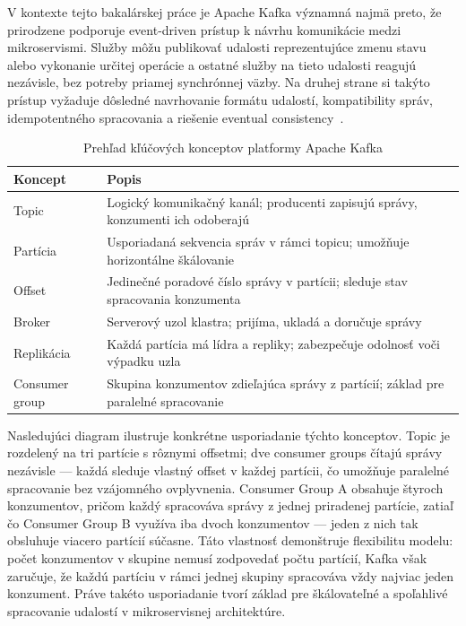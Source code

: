 V kontexte tejto bakalárskej práce je Apache Kafka významná najmä preto, že prirodzene podporuje event-driven prístup k návrhu komunikácie medzi mikroservismi. Služby môžu publikovať udalosti reprezentujúce zmenu stavu alebo vykonanie určitej operácie a ostatné služby na tieto udalosti reagujú nezávisle, bez potreby priamej synchrónnej väzby. Na druhej strane si takýto prístup vyžaduje dôsledné navrhovanie formátu udalostí, kompatibility správ, idempotentného spracovania a riešenie eventual consistency~\cite{KafkaDocs2025}.

\begin{table}[H]
\centering
\begin{tabular}{|l|p{}|}
\hline
\textbf{Koncept} & \textbf{Popis} \\ \hline
Topic      & Logický komunikačný kanál; producenti zapisujú správy, konzumenti ich odoberajú \\ \hline
Partícia   & Usporiadaná sekvencia správ v rámci topicu; umožňuje horizontálne škálovanie \\ \hline
Offset     & Jedinečné poradové číslo správy v partícii; sleduje stav spracovania konzumenta \\ \hline
Broker     & Serverový uzol klastra; prijíma, ukladá a doručuje správy \\ \hline
Replikácia & Každá partícia má lídra a repliky; zabezpečuje odolnosť voči výpadku uzla \\ \hline
Consumer group & Skupina konzumentov zdieľajúca správy z partícií; základ pre paralelné spracovanie \\ \hline
\end{tabular}
\caption{Prehľad kľúčových konceptov platformy Apache Kafka}
\label{tab:kafka-concepts}
\end{table}

Nasledujúci diagram ilustruje konkrétne usporiadanie týchto konceptov. Topic je rozdelený na tri partície s rôznymi offsetmi; dve consumer groups čítajú správy nezávisle — každá sleduje vlastný offset v každej partícii, čo umožňuje paralelné spracovanie bez vzájomného ovplyvnenia. Consumer Group A obsahuje štyroch konzumentov, pričom každý spracováva správy z jednej priradenej partície, zatiaľ čo Consumer Group B využíva iba dvoch konzumentov — jeden z nich tak obsluhuje viacero partícií súčasne. Táto vlastnosť demonštruje flexibilitu modelu: počet konzumentov v skupine nemusí zodpovedať počtu partícií, Kafka však zaručuje, že každú partíciu v rámci jednej skupiny spracováva vždy najviac jeden konzument. Práve takéto usporiadanie tvorí základ pre škálovateľné a spoľahlivé spracovanie udalostí v mikroservisnej architektúre.

